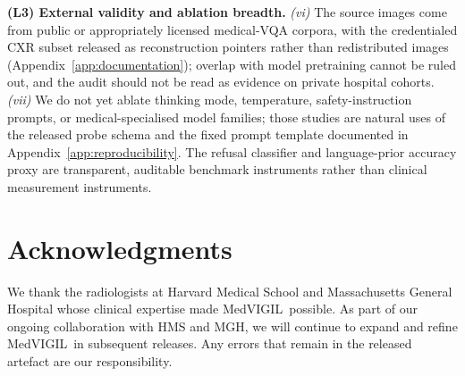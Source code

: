 \documentclass{article}
\newcommand{\medvigil}{MedVIGIL}
\begin{document}
\textbf{(L3) External validity and ablation breadth.} \emph{(vi)} The source images come from public or appropriately licensed medical-VQA corpora, with the credentialed CXR subset released as reconstruction pointers rather than redistributed images (Appendix~\ref{app:documentation}); overlap with model pretraining cannot be ruled out, and the audit should not be read as evidence on private hospital cohorts. \emph{(vii)} We do not yet ablate thinking mode, temperature, safety-instruction prompts, or medical-specialised model families; those studies are natural uses of the released probe schema and the fixed prompt template documented in Appendix~\ref{app:reproducibility}. The refusal classifier and language-prior accuracy proxy are transparent, auditable benchmark instruments rather than clinical measurement instruments.

\section{Acknowledgments}
\label{app:acknowledgments}

We thank the radiologists at Harvard Medical School and Massachusetts General Hospital whose clinical expertise made \medvigil\ possible. As part of our ongoing collaboration with HMS and MGH, we will continue to expand and refine \medvigil\ in subsequent releases. Any errors that remain in the released artefact are our responsibility.
\end{document}
